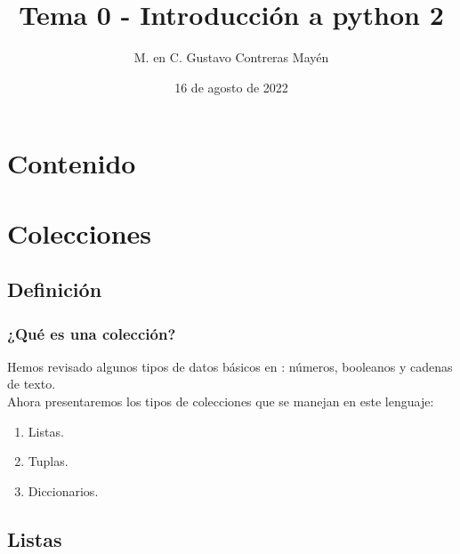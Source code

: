 \documentclass[12pt]{beamer}
\title{Tema 0 - Introducción a python 2}
\author{M. en C. Gustavo Contreras Mayén}
\date{16 de agosto de 2022}
\begin{document}
\maketitle

\section*{Contenido}

\section{Colecciones}
\subsection{Definición}

\begin{frame}
\frametitle{¿Qué es una colección?}
Hemos revisado algunos tipos de datos básicos en \python: números, booleanos y cadenas de texto.
\\
\bigskip
\pause
Ahora presentaremos los tipos de colecciones que se manejan en este lenguaje:
\pause
{}
\begin{enumerate}[<+->]
\item Listas.
\item Tuplas.
\item Diccionarios.
\end{enumerate}
\end{frame}

\subsection{Listas}
\end{document}
